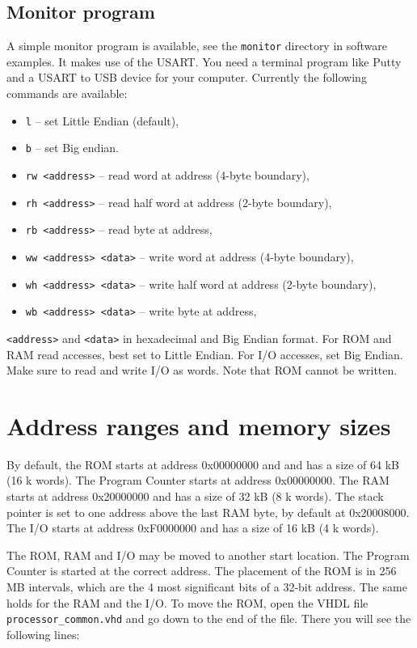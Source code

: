 \documentclass[12pt]{article}
\begin{document}
\subsection{Monitor program}
A simple monitor program is available, see the \texttt{monitor} directory in software examples. It makes use of the USART. You need a terminal program like Putty and a USART to USB device for your computer. Currently the following commands are available:

\begin{itemize}
\item \texttt{l} -- set Little Endian (default),
\item \texttt{b} -- set Big endian.
\item \texttt{rw <address>} -- read word at address (4-byte boundary),
\item \texttt{rh <address>} -- read half word at address (2-byte boundary),
\item \texttt{rb <address>} -- read byte at address,
\item \texttt{ww <address> <data>} -- write word at address (4-byte boundary),
\item \texttt{wh <address> <data>} -- write half word at address (2-byte boundary),
\item \texttt{wb <address> <data>} -- write byte at address,
\end{itemize}

\texttt{<address>} and \texttt{<data>} in hexadecimal and Big Endian format. For ROM and RAM read accesses, best set to Little Endian. For I/O accesses, set Big Endian. Make sure to read and write I/O as words. Note that ROM cannot be written.

\section{Address ranges and memory sizes}
By default, the ROM starts at address 0x00000000 and and has a size of 64 kB (16 k words). The Program Counter starts at address 0x00000000. The RAM starts at address 0x20000000 and has a size of 32 kB (8 k words). The stack pointer is set to one address above the last RAM byte, by default at 0x20008000. The I/O starts at address 0xF0000000 and has a size of 16 kB (4 k words).

The ROM, RAM and I/O may be moved to another start location. The Program Counter is started at the correct address. The placement of the ROM is in 256 MB intervals, which are the 4 most significant bits of a 32-bit address. The same holds for the RAM and the I/O. To move the ROM, open the VHDL file \lstinline|processor_common.vhd| and go down to the end of the file. There you will see the following lines:
\end{document}
